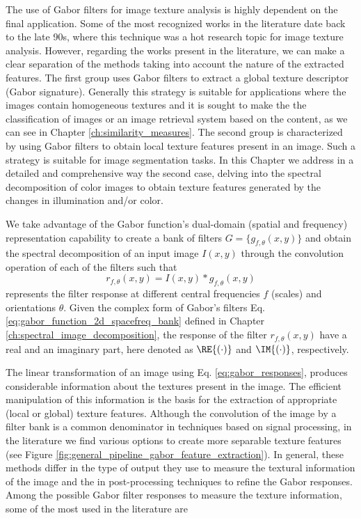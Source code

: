 The use of Gabor filters for image texture analysis is highly dependent on the final application. Some of the most recognized works in the literature date back to the late 90s, where this technique was a hot research topic for image texture analysis. However, regarding the works present in the literature, we can make a clear separation of the methods taking into account the nature of the extracted features. The first group uses Gabor filters to extract a global texture descriptor (Gabor signature). Generally this strategy is suitable for applications where the images contain homogeneous textures and it is sought to make the the classification of images or an image retrieval system based on the content, as we can see in Chapter \ref{ch:similarity_measures}. The second group is characterized by using Gabor filters to obtain local texture features present in an image. Such a strategy is suitable for image segmentation tasks. In this Chapter we address in a detailed and comprehensive way the second case, delving into the spectral decomposition of color images to obtain texture features generated by the changes in illumination and/or color.

We take advantage of the Gabor function's dual-domain (spatial and frequency) representation capability to create a bank of filters $G=\{g_{f, \theta}(x, y) \}$ and obtain the spectral decomposition of an input image $I(x, y)$ through the convolution operation of each of the filters such that 
\begin{equation}\label{eq:gabor_responses}
    r_{f, \theta}(x,y) = I(x, y) \ast g_{f, \theta}(x,y)
\end{equation}
represents the filter response at different central frequencies $f$ (scales) and orientations $\theta$. Given the complex form of Gabor's filters Eq. \eqref{eq:gabor_function_2d_spacefreq_bank} defined in Chapter \ref{ch:spectral_image_decomposition}, the response of the filter $r_{f,\theta}(x, y)$ have a real and an imaginary part, here denoted as $\RE{(\cdot)}$ and $\IM{(\cdot)}$, respectively.

The linear transformation of an image using Eq. \eqref{eq:gabor_responses}, produces considerable information about the textures present in the image. The efficient manipulation of this information is the basis for the extraction of appropriate (local or global) texture features. Although the convolution of the image by a filter bank is a common denominator in techniques based on signal processing, in the literature we find various options to create more separable texture features (see Figure \ref{fig:general_pipeline_gabor_feature_extraction}). In general, these methods differ in the type of output they use to measure the textural information of the image and the in post-processing techniques to refine the Gabor responses. Among the possible Gabor filter responses to measure the texture information, some of the most used in the literature are

